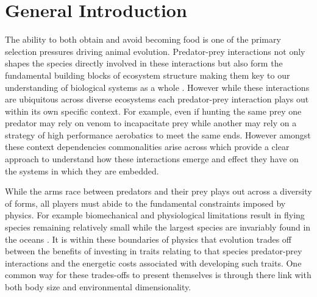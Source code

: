 \chapter{General Introduction}
\label{chap:introduction}%


\noindent
The ability to both obtain and avoid becoming food is one of the primary selection pressures driving animal evolution. Predator-prey interactions not only shapes the species directly involved in these interactions but also form the fundamental building blocks of ecosystem structure making them key to our understanding of biological systems as a whole \citep{pimm1984complexity,cohen1990community}. However while these interactions are ubiquitous across diverse ecosystems each predator-prey interaction plays out within its own specific context. For example, even if hunting the same prey one predator may rely on venom to incapacitate prey while another may rely on a strategy of high performance aerobatics to meet the same ends. However amongst these context dependencies commonalities arise across which provide a clear approach to understand how these interactions emerge and effect they have on the systems in which they are embedded.


While the arms race between predators and their prey plays out across a diversity of forms, all players must abide to the fundamental constraints imposed by physics. For example biomechanical and physiological limitations result in flying species remaining relatively small \citep{chatterjee2007aerodynamics,dudley2002mechanisms} while the largest species are invariably found in the oceans \citep{heim2015cope}. It is within these boundaries of physics that evolution trades off between the benefits of investing in traits relating to that species predator-prey interactions and the energetic costs associated with developing such traits. One common way for these trades-offs to present themselves is through there link with both body size and environmental dimensionality.


